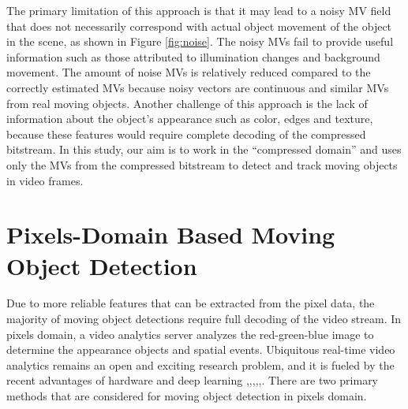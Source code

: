The primary limitation of this approach is that it may lead to a noisy MV field that does not necessarily correspond with actual object movement of the object in the scene, as shown in Figure \ref{fig:noise}. The noisy MVs fail to provide useful information such as those attributed to illumination changes and background movement. The amount of noise MVs is relatively reduced compared to the correctly estimated MVs because noisy vectors are continuous and similar MVs from real moving objects. Another challenge of this approach is the lack of information about the object’s appearance such as color, edges and texture, because these features would require complete decoding of the compressed bitstream. In this study, our aim is to work in the “compressed domain” and uses only the MVs from the compressed bitstream to detect and track moving objects in video frames. 

\section{Pixels-Domain Based Moving Object Detection}
Due to more reliable features that can be extracted from the pixel data, the majority of moving object detections require full decoding of the video stream. In pixels domain, a video analytics server analyzes the red-green-blue image to determine the appearance objects and spatial events. Ubiquitous real-time video analytics remains an open and exciting research problem, and it is fueled by the recent advantages of hardware and deep learning \cite{zeng2018background},\cite{chen2017pixel},\cite{babaee2018deep},\cite{wang2017interactive},\cite{patil2018msfgnet},\cite{ou2019moving}. There are two primary methods that are considered for moving object detection in pixels domain.
